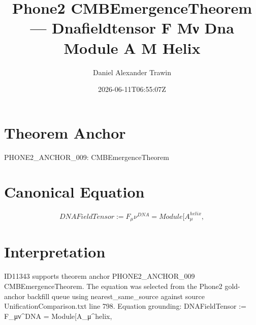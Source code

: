 \documentclass[11pt]{article}
\title{Phone2 CMBEmergenceTheorem — Dnafieldtensor F Μν Dna Module A Μ Helix}
\author{Daniel Alexander Trawin}
\date{2026-06-11T06:55:07Z}
\begin{document}
\maketitle
\section*{Theorem Anchor}
PHONE2_ANCHOR_009: CMBEmergenceTheorem
\section*{Canonical Equation}
\[
DNAFieldTensor := F_μν^{DNA} = Module[{A_μ^{helix}},
\]
\section*{Interpretation}
ID11343 supports theorem anchor PHONE2_ANCHOR_009 CMBEmergenceTheorem. The equation was selected from the Phone2 gold-anchor backfill queue using nearest_same_source against source UnificationComparison.txt line 798. Equation grounding: DNAFieldTensor := F_μν^{DNA} = Module[{A_μ^{helix}},
\end{document}
